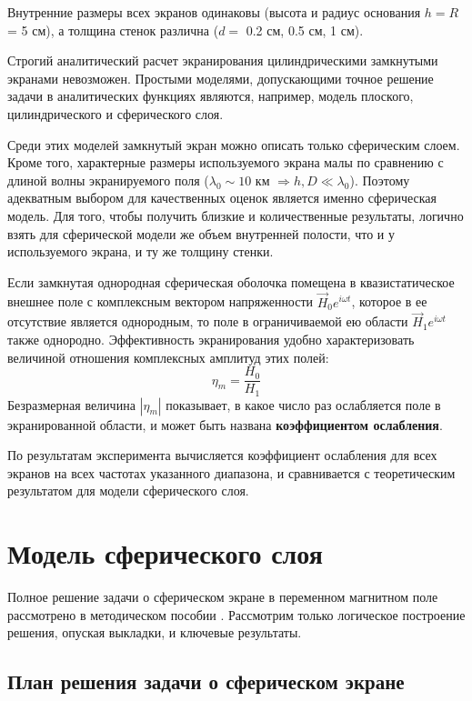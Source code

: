 \documentclass[a4paper,12pt]{article}
\begin{document}
Внутренние размеры всех экранов одинаковы (высота и радиус основания $h=R$ = 5 см), а толщина стенок различна ($d=$ 0.2 см, 0.5 см, 1 см). 

Строгий аналитический расчет экранирования цилиндрическими замкнутыми экранами невозможен. Простыми моделями, допускающими точное решение задачи в аналитических функциях являются, например, модель плоского, цилиндрического и сферического слоя.

Среди этих моделей замкнутый экран можно описать только сферическим слоем. Кроме того, характерные размеры используемого экрана малы по сравнению с длиной волны экранируемого поля ($\lambda_0\sim10$ км $\Rightarrow h,D\ll\lambda_0$). Поэтому адекватным выбором для качественных оценок является именно сферическая модель. Для того, чтобы получить близкие и количественные результаты, логично взять для сферической модели же объем внутренней полости, что и у используемого экрана, и ту же толщину стенки.


Если замкнутая однородная сферическая оболочка помещена в квазистатическое внешнее поле с комплексным вектором напряженности $\vec{H}_{0} e^{i \omega t}$, которое в ее отсутствие является однородным, то поле в ограничиваемой ею области $\vec{H}_{1} e^{i \omega t}$ также однородно. Эффективность экранирования удобно характеризовать величиной отношения комплексных амплитуд этих полей:
\begin{equation} 
	\eta_{m}=\frac{H_0}{H_1}
	\label{eq:1}
\end{equation}
Безразмерная величина $|\eta_{m}|$ показывает, в какое число раз ослабляется поле в экранированной области, и может быть названа \textbf{коэффициентом ослабления}. 

По результатам эксперимента вычисляется коэффициент ослабления для всех экранов на всех частотах указанного диапазона, и сравнивается с теоретическим результатом для модели сферического слоя.

\newpage
\section{Модель сферического слоя}

Полное решение задачи о сферическом экране в переменном магнитном поле рассмотрено в  методическом пособии \cite{met}. Рассмотрим только логическое построение решения, опуская выкладки, и ключевые результаты.

\subsection{План решения задачи о сферическом экране}
\end{document}

